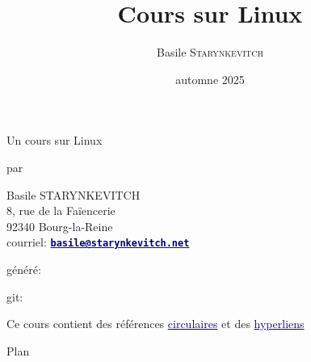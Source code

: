 \documentclass[lualatex,11pt,a4paper,svgnames,french]{beamer}
\title{Cours sur Linux}
\author{Basile \textsc{Starynkevitch}}
\date{automne 2025}
\newcommand{\clbemail}[1]{{\href{mailto:#1}{\texttt{\textbf{\textcolor{Navy}{#1}}}}}}
\begin{document}
\begin{frame}
\titlepage
\end{frame}

\begin{frame}{Un cours sur Linux}

  par

  \begin{center}Basile STARYNKEVITCH \\
  8, rue de la Faïencerie \\
  92340 Bourg-la-Reine \\
  courriel: \clbemail{basile@starynkevitch.net}
  \end{center}
  \bigskip
  
  généré: \textit{\clbdate} 

  \bigskip
  
  git: \texttt{\clbgitid}

  \begin{center}
    Ce cours contient des références
    \href{https://fr.wikipedia.org/wiki/Raisonnement_circulaireq}{\textcolor{Navy}{circulaires}}
    et des
    \href{https://fr.wikipedia.org/wiki/Hyperlien}{\textcolor{Navy}{hyperliens}}
  \end{center}
\end{frame}

\begin{frame}{Plan}
  \tableofcontents
\end{frame}

\end{document}
